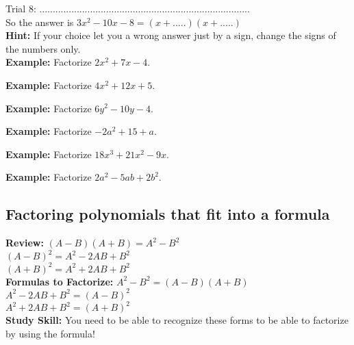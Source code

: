 \documentclass{ximera}
\begin{document}
Trial 8: ...............................................................................\\

So the answer is $3x^2 -10x -8 = (x + .....) (x + .....)$\\

{\bf Hint:} If your choice let you a wrong answer just by a sign, change the signs of the numbers only.\\

{\bf Example:} Factorize $2x^2 +7x -4 $.\\
\vspace{4 cm}

{\bf Example:} Factorize $4x^2 +12x +5 $.\\
\vspace{4 cm}

{\bf Example:} Factorize $6y^2 - 10y -4 $.\\
\vspace{4 cm}

{\bf Example:} Factorize $-2a^2 +15 +a $.\\
\vspace{4 cm}

{\bf Example:} Factorize $18x^3 +21x^2 -9x$.\\
\vspace{4 cm}

{\bf Example:} Factorize $2a^2 - 5ab + 2b^2$.\\
\vspace{3 cm}



\subsection{Factoring polynomials that fit into a formula}

{\bf Review:} $(A-B)(A+B) = A^2 - B^2$\\

$(A-B)^2 = A^2 -2AB + B^2$\\

$(A+B)^2 = A^2 +2AB + B^2$\\


{\bf Formulas to Factorize:} $A^2 - B^2 =(A-B)(A+B) $\\

$A^2 -2AB + B^2 = (A-B)^2  $\\

$A^2 +2AB + B^2 = (A+B)^2  $\\

{\bf Study Skill:} You need to be able to recognize these forms to be able to factorize by using the formula!\\
\end{document}
